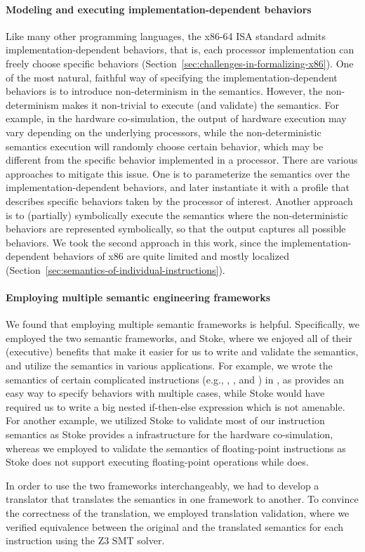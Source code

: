 \paragraph{Modeling and executing implementation-dependent behaviors}

Like many other programming languages, the x86-64 ISA standard admits implementation-dependent behaviors, that is, each processor implementation can freely choose specific behaviors (Section~\ref{sec:challenges-in-formalizing-x86}). One of the most natural, faithful way of specifying the implementation-dependent behaviors is to introduce non-determinism in the semantics. However, the non-determinism makes it non-trivial to execute (and validate) the semantics. For example, in the hardware co-simulation, the output of hardware execution may vary depending on the underlying processors, while the non-deterministic semantics execution will randomly choose certain behavior, which may be different from the specific behavior implemented in a processor. There are various approaches to mitigate this issue. One is to parameterize the semantics over the implementation-dependent behaviors, and later instantiate it with a profile that describes specific behaviors taken by the processor of interest. Another approach is to (partially) symbolically execute the semantics where the non-deterministic behaviors are represented symbolically, so that the output captures all possible behaviors. We took the second approach in this work, since the implementation-dependent behaviors of x86 are quite limited and mostly localized (Section~\ref{sec:semantics-of-individual-instructions}).

\paragraph{Employing multiple semantic engineering frameworks}

We found that employing multiple semantic frameworks is helpful. Specifically, we employed the two semantic frameworks, \K and Stoke, where we enjoyed all of their (executive) benefits that make it easier for us to write and validate the semantics, and utilize the semantics in various applications. For example, we wrote the semantics of certain complicated instructions (e.g., , , and ) in \K, as \K provides an easy way to specify behaviors with multiple cases, while Stoke would have required us to write a big nested if-then-else expression which is not amenable. For another example, we utilized Stoke to validate most of our instruction semantics as Stoke provides a infrastructure for the hardware co-simulation, whereas we employed \K to validate the semantics of floating-point instructions as Stoke does not support executing floating-point operations while \K does.

In order to use the two frameworks interchangeably, we had to develop a translator that translates the semantics in one framework to another. To convince the correctness of the translation, we employed translation validation, where we verified equivalence between the original and the translated semantics for each instruction using the Z3 SMT solver.
